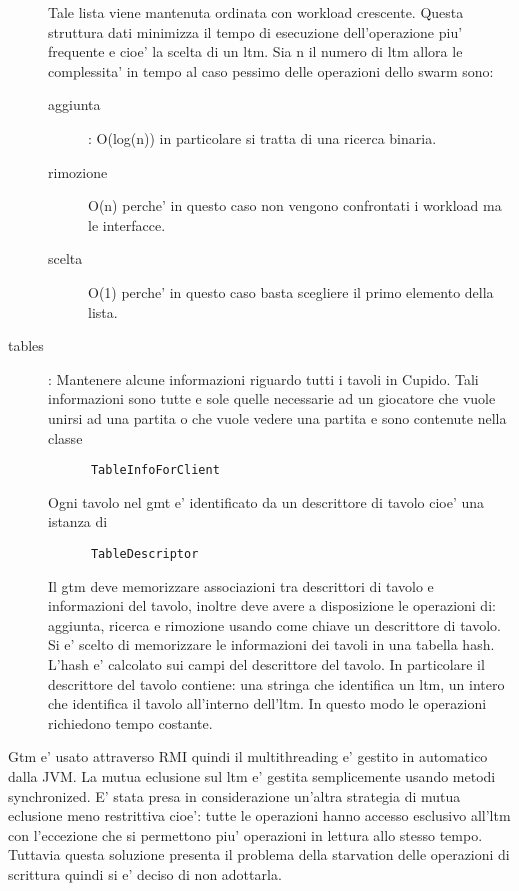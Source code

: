 \begin{description}
\begin{center}
	\end{center}
	Tale lista viene mantenuta ordinata con workload crescente. Questa struttura dati minimizza il tempo di esecuzione dell'operazione piu' frequente e cioe' la scelta di un ltm.  Sia n il numero di ltm allora le complessita' in tempo al caso pessimo delle operazioni dello swarm sono:
	\begin{description}
	  \item[aggiunta]: 
	    O(log(n)) in particolare si tratta di una ricerca binaria.
	  \item[rimozione]
	    O(n) perche' in questo caso non vengono confrontati i workload ma le interfacce.
	  \item[scelta]
	    O(1) perche' in questo caso basta scegliere il primo elemento della lista.
	\end{description}
      \item[tables]:
	Mantenere alcune informazioni riguardo tutti i tavoli in Cupido. Tali informazioni sono tutte e sole quelle necessarie ad un giocatore che vuole unirsi ad una partita o che vuole vedere una partita e sono contenute nella classe 
	\begin{verbatim}
	  TableInfoForClient
	\end{verbatim}
	Ogni tavolo nel gmt e' identificato da un descrittore di tavolo cioe' una istanza di
	\begin{verbatim}
	  TableDescriptor
	\end{verbatim}
	Il gtm deve memorizzare associazioni tra descrittori di tavolo e informazioni del tavolo, inoltre deve avere a disposizione le operazioni di: aggiunta, ricerca e rimozione usando come chiave un descrittore di tavolo. Si e' scelto di memorizzare le informazioni dei tavoli in una tabella hash. L'hash e' calcolato sui campi del descrittore del tavolo. In particolare il descrittore del tavolo contiene: una stringa che identifica un ltm, un intero che identifica il tavolo all'interno dell'ltm. In questo modo le operazioni richiedono tempo costante.
    \end{description}
  Gtm e' usato attraverso RMI quindi il multithreading e' gestito in automatico dalla JVM. La mutua eclusione sul ltm e' gestita semplicemente usando metodi synchronized. E' stata presa in considerazione un'altra strategia di mutua eclusione meno restrittiva cioe': tutte le operazioni hanno accesso esclusivo all'ltm con l'eccezione che si permettono piu' operazioni in lettura allo stesso tempo. Tuttavia questa soluzione presenta il problema della starvation delle operazioni di scrittura quindi si e' deciso di non adottarla.


